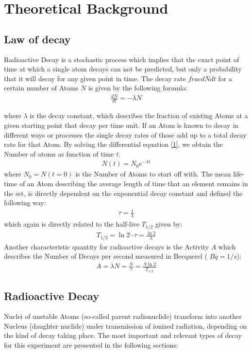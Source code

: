 \documentclass[12pt]{article}
\begin{document}
\newpage
\section{Theoretical Background}

\subsection{Law of decay}\label{zerfallsgesetz}

Radioactive Decay is a stochastic process which implies that the exact point of time at which a single atom decays can not be predicted, but only a probability that it will decay for any given point in time.  
The decay rate $frac{dN}{dt}$ for a certain number of Atoms $N$ is given by the following formula:
\begin{align}
\frac{dN}{dt}=-\lambda N \label{1}
\end{align}

where $\lambda$ is the decay constant, which describes the fraction of existing Atoms at a given starting point that decay per time unit.
If an Atom is known to decay in different ways or processes the single decay rates of those add up to a total decay rate for that Atom.
By solving the differential equation \ref{1}, we obtain the Number of atoms as function of time $t$.
\begin{align}
N(t)=N_0e^{-\lambda t}
\end{align}
where $N_0=N(t=0)$ is the Number of Atoms to start off with.
The mean life-time of an Atom describing the average length of time that an element remains in the set, is directly dependent on the exponential decay constant and defined the following way:
\begin{align}
\tau=\frac{1}{\lambda}
\end{align}
which again is directly related to the half-live $T_{1/2}$ given by:
\begin{align}
T_{1/2} = \ln2\cdot \tau = \frac{\ln2}{\lambda}
\end{align}
Another characteristic quantity for radioactive decays is the Activity $A$ which describes the Number of Decays per second measured in Becquerel ( $Bq=1/s$):
\begin{align}
A = \lambda N = \frac{N}{\tau} = \frac{N\ln2}{T_{1/2}}\label{activity}
\end{align}

\subsection{Radioactive Decay}
Nuclei of unstable Atoms (so-called parent radionuclide) transform into another Nucleus (daughter nuclide) under transmission of ionized radiation, depending on the kind of decay taking place. The most important and relevant types of decay for this experiment are presented in the following sections:
\end{document}
